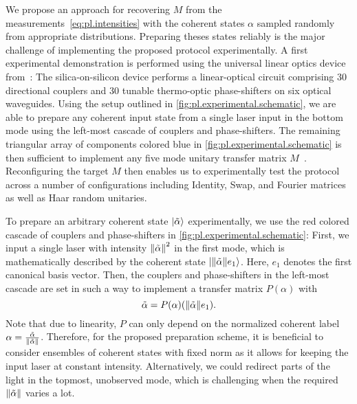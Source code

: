 We propose an approach for recovering $M$ from the measurements~\eqref{eq:pl.intensities} with the coherent states $\alpha$ sampled randomly from appropriate distributions.
Preparing theses states reliably is the major challenge of implementing the proposed protocol experimentally.
A first experimental demonstration is performed using the universal linear optics device from~\cite{Carolan_2015_Universal}:
The silica-on-silicon device performs a linear-optical circuit comprising 30 directional couplers and 30 tunable thermo-optic phase-shifters on six optical waveguides.
Using the setup outlined in \cref{fig:pl.experimental.schematic}, we are able to prepare any coherent input state from a single laser input in the bottom mode using the left-most cascade of couplers and phase-shifters.
The remaining triangular array of components colored blue in \cref{fig:pl.experimental.schematic} is then sufficient to implement any five mode unitary transfer matrix $M$~\cite{Reck_1994_Experimental}.
Reconfiguring the target $M$ then enables us to experimentally test the protocol across a number of configurations including Identity, Swap, and Fourier matrices as well as Haar random unitaries.

To prepare an arbitrary coherent state $\ket{\tilde \alpha}$ experimentally, we use the red colored cascade of couplers and phase-shifters in \cref{fig:pl.experimental.schematic}:
First, we input a single laser with intensity ${\Vert\tilde\alpha\Vert}^2$ in the first mode, which is mathematically described by the coherent state $\ket{\norm{\tilde\alpha} e_1}$.
Here, $e_1$ denotes the first canonical basis vector.
Then, the couplers and phase-shifters in the left-most cascade are set in such a way to implement a transfer matrix $P(\alpha)$ with
\[
  \label{eq:pl.phaselift_P}
  \tilde\alpha = P(\alpha) ({\Vert\tilde\alpha\Vert} e_1).
\]
Note that due to linearity, $P$ can only depend on the normalized coherent label $\alpha = \frac{\tilde \alpha}{{\Vert\tilde \alpha\Vert}}$.
Therefore, for the proposed preparation scheme, it is beneficial to consider ensembles of coherent states with fixed norm as it allows for keeping the input laser at constant intensity.
Alternatively, we could redirect parts of the light in the topmost, unobserved mode, which is challenging when the required ${\Vert\tilde\alpha\Vert}$ varies a lot.\\



